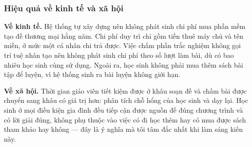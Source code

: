 
\subsubsection{Hiệu quả về kinh tế và xã hội}

\textbf{Về kinh tế.} Hệ thống tự xây dựng nên không phát sinh chi phí mua phần
mềm tạo đề thương mại hằng năm. Chi phí duy trì chỉ gồm tiền thuê máy chủ và
tên miền, ở mức một cá nhân chi trả được. Việc chấm phần trắc nghiệm không gọi
trí tuệ nhân tạo nên không phát sinh chi phí theo số lượt làm bài, dù có bao
nhiêu học sinh cùng sử dụng. Ngoài ra, học sinh không phải mua thêm sách bài
tập để luyện, vì hệ thống sinh ra bài luyện không giới hạn.

\textbf{Về xã hội.} Thời gian giáo viên tiết kiệm được ở khâu soạn đề và chấm
bài được chuyển sang khâu có giá trị hơn: phân tích chỗ hổng của học sinh và
dạy lại. Học sinh ở mọi điều kiện gia đình đều tiếp cận được nguồn đề đúng
chương trình và có lời giải đúng, không phụ thuộc vào việc có đi học thêm hay
có mua được sách tham khảo hay không --- đây là ý nghĩa mà tôi tâm đắc nhất khi
làm sáng kiến này.

\bigskip
